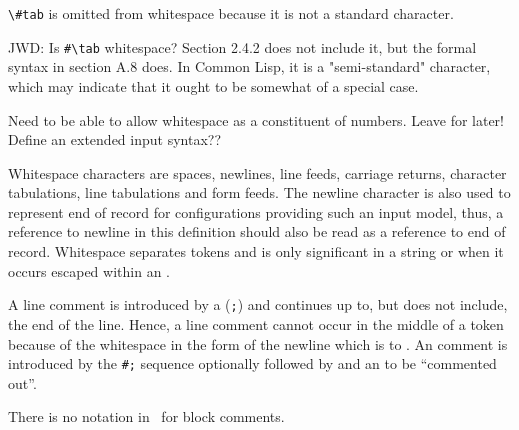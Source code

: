 %
\label{comments}
%
\begin{optPrivate}
    \verb+\#tab+ is omitted from whitespace because it is not a standard
    character.

    JWD: Is \verb+#\tab+ whitespace?  Section 2.4.2 does not include it, but the
    formal syntax in section A.8 does.  In Common Lisp, it is a "semi-standard"
    character, which may indicate that it ought to be somewhat of a special
    case.

    Need to be able to allow whitespace as a constituent of numbers.  Leave for
    later!  Define an extended input syntax??
\end{optPrivate}
%
\begin{optDefinition}
Whitespace characters are spaces, newlines, line
feeds, carriage returns, character tabulations, line tabulations and form feeds.
The newline character is also used to represent end of record for configurations
providing such an input model, thus, a reference to newline in this definition
should also be read as a reference to end of record.  Whitespace separates
tokens and is only significant in a string or when it occurs escaped within an
.

A line comment  is introduced by a 
(\verb+;+) and continues up to, but does not include, the end of the line.
Hence, a line comment cannot occur in the middle of a token because of the
whitespace in the form of the newline which is to .  An
 comment  is introduced by the
\verb+#;+ sequence optionally followed by  and an
 to be ``commented out''.
%
\Syntax
{}

%
\begin{note}
    There is no notation in \eulisp\ for block comments.
\end{note}
\end{optDefinition}


